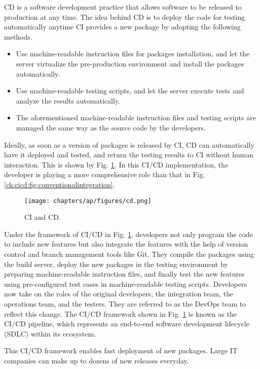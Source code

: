 CD is a software development practice that allows software to be released to production at any time. The idea behind CD is to deploy the code for testing automatically anytime CI provides a new package by adopting the following methods.
\begin{itemize}
  \item Use machine-readable instruction files for packages installation, and let the server virtualize the pre-production environment and install the packages automatically.
  \item Use machine-readable testing scripts, and let the server execute tests and analyze the results automatically.
  \item The aforementioned machine-readable instruction files and testing scripts are managed the same way as the source code by the developers.
\end{itemize}

Ideally, as soon as a version of packages is released by CI, CD can automatically have it deployed and tested, and return the testing results to CI without human interaction. This is shown by Fig. \ref{ch:cicd:fig:cd}. In this CI/CD implementation, the developer is playing a more comprehensive role than that in Fig. \ref{ch:cicd:fig:conventionalintegration}.
\begin{figure}[htbp]
	\centering
	\texttt{[image: chapters/ap/figures/cd.png]}
	\caption{CI and CD.} \label{ch:cicd:fig:cd}
\end{figure}

Under the framework of CI/CD in Fig. \ref{ch:cicd:fig:cd}, developers not only program the code to include new features but also integrate the features with the help of version control and branch management tools like Git. They compile the packages using the build server, deploy the new packages in the testing environment by preparing machine-readable instruction files, and finally test the new features using pre-configured test cases in machine-readable testing scripts. Developers now take on the roles of the original developers, the integration team, the operations team, and the testers. They are referred to as the DevOps team to reflect this change. The CI/CD framework shown in Fig. \ref{ch:cicd:fig:cd} is known as the CI/CD pipeline, which represents an end-to-end software development lifecycle (SDLC) within its ecosystem.

This CI/CD framework enables fast deployment of new packages. Large IT companies can make up to dozens of new releases everyday.

